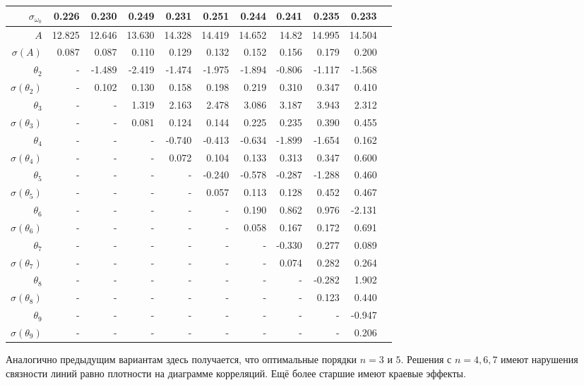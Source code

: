 \documentclass{matmex-diploma-custom}
\begin{document}
\begin{table}[h!!]
\begin{tabular}{r|rr|r|r|r|rrrrr}
 $\sigma_{\omega_0} $& 0.226       &     0.230 &   0.249 &   0.231 &   0.251 &   0.244 &    0.241 &   0.235 &   0.233 \\\hline
 $A $&12.825      &   12.646 &   13.630 &  14.328 &  14.419 &  14.652 &    14.82 &  14.995 &  14.504 \\
 $\sigma(A) $ & 0.087       &    0.087 &    0.110 &   0.129 &   0.132 &   0.152 &    0.156 &   0.179 &     0.200 \\
 $\theta_2$&-        &  -1.489 &  -2.419 &  -1.474 &  -1.975 &  -1.894 &   -0.806 &  -1.117 &  -1.568 \\
 $\sigma(\theta_2)$&-      &     0.102 &    0.130 &   0.158 &   0.198 &   0.219 &     0.310 &   0.347 &    0.410 \\
 $\theta_3$&-      &    - &   1.319 &   2.163 &   2.478 &   3.086 &    3.187 &   3.943 &   2.312 \\
 $\sigma(\theta_3)$&-      &    - &   0.081 &   0.124 &   0.144 &   0.225 &    0.235 &   0.390 &   0.455 \\
 $\theta_4$&-      &    - &    - &  -0.740 &  -0.413 &  -0.634 &   -1.899 &  -1.654 &   0.162 \\
 $\sigma(\theta_4)$&-      &    - &    - &     0.072 &   0.104 &   0.133 &    0.313 &   0.347 &   0.600 \\
 $\theta_5$&-      &    - &    - &    - &  -0.240 &  -0.578 &   -0.287 &  -1.288 &   0.460 \\
 $\sigma(\theta_5)$&-      &    - &    - &    - &     0.057 &   0.113 &    0.128 &   0.452 &   0.467 \\
 $\theta_6$&-      &    - &    - &    - &    - &   0.190 &    0.862 &   0.976 &  -2.131 \\
 $\sigma(\theta_6)$&-    &    - &    - &    - &    - &   0.058 &    0.167 &   0.172 &   0.691 \\
 $\theta_7$&-     &    - &    - &    - &    - &    - &  -0.330 &   0.277 &   0.089 \\
 $ \sigma(\theta_7)$&-     &    - &    - &    - &    - &    - &      0.074 &   0.282 &   0.264 \\
 $\theta_8$&-     &    - &    - &    - &    - &    - &    - &   -0.282 &   1.902 \\
 $ \sigma(\theta_8)$&-     &    - &    - &    - &    - &    - &    - &     0.123 &   0.440 \\
 $\theta_9$&-     &    - &    - &    - &    - &    - &    - &    - &  -0.947  \\
 $ \sigma(\theta_9)$&-     &    - &    - &    - &    - &    - &    - &    - &   0.206  \\
\end{tabular}
\end{table}
Аналогично предыдущим вариантам здесь получается, что оптимальные порядки $n=3$ и $5$. Решения с $n=4, 6, 7$ имеют нарушения связности линий равно плотности на диаграмме корреляций. Ещё более старшие имеют краевые эффекты. 
\pagebreak
\end{document}
